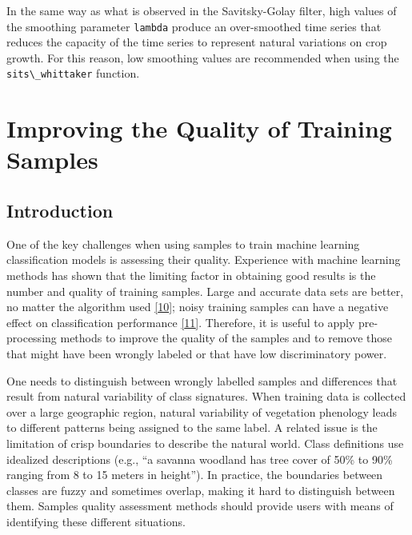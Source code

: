 \documentclass[
  11pt,
]{report}
\newcommand{\passthrough}[1]{#1}
\begin{document}
In the same way as what is observed in the Savitsky-Golay filter, high
values of the smoothing parameter \passthrough{\lstinline!lambda!}
produce an over-smoothed time series that reduces the capacity of the
time series to represent natural variations on crop growth. For this
reason, low smoothing values are recommended when using the
\passthrough{\lstinline!sits\_whittaker!} function.

\hypertarget{improving-the-quality-of-training-samples}{%
\chapter*{Improving the Quality of Training
Samples}\label{improving-the-quality-of-training-samples}}

\hypertarget{introduction}{%
\section*{Introduction}\label{introduction}}

One of the key challenges when using samples to train machine learning
classification models is assessing their quality. Experience with
machine learning methods has shown that the limiting factor in obtaining
good results is the number and quality of training samples. Large and
accurate data sets are better, no matter the algorithm used
\protect\hyperlink{ref-Maxwell2018}{{[}10{]}}; noisy training samples
can have a negative effect on classification performance
\protect\hyperlink{ref-Frenay2014}{{[}11{]}}. Therefore, it is useful to
apply pre-processing methods to improve the quality of the samples and
to remove those that might have been wrongly labeled or that have low
discriminatory power.

One needs to distinguish between wrongly labelled samples and
differences that result from natural variability of class signatures.
When training data is collected over a large geographic region, natural
variability of vegetation phenology leads to different patterns being
assigned to the same label. A related issue is the limitation of crisp
boundaries to describe the natural world. Class definitions use
idealized descriptions (e.g., ``a savanna woodland has tree cover of
50\% to 90\% ranging from 8 to 15 meters in height''). In practice, the
boundaries between classes are fuzzy and sometimes overlap, making it
hard to distinguish between them. Samples quality assessment methods
should provide users with means of identifying these different
situations.
\end{document}
